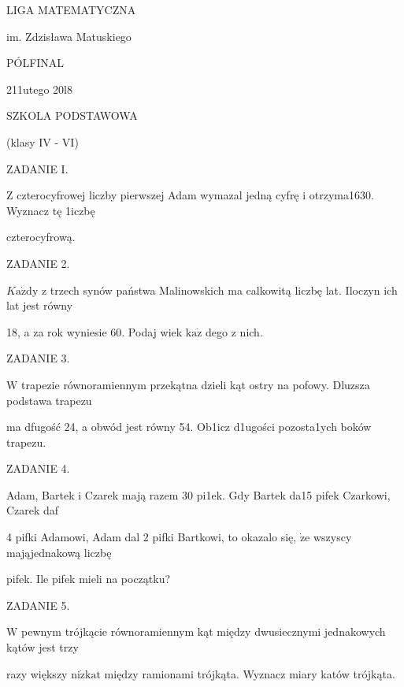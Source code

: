 \documentclass[a4paper,12pt]{article}
\begin{document}
LIGA MATEMATYCZNA

im. Zdzisława Matuskiego

PÓLFINAL

211utego 20l8

SZKOLA PODSTAWOWA

(klasy IV - VI)

ZADANIE I.

$\mathrm{Z}$ czterocyfrowej liczby pierwszej Adam wymazal jedną cyfrę i otrzyma1630. Wyznacz tę 1iczbę

czterocyfrową.

ZADANIE 2.

$K\mathrm{a}\dot{\mathrm{z}}\mathrm{d}\mathrm{y}$ z trzech synów państwa Malinowskich ma calkowitą liczbę lat. Iloczyn ich lat jest równy

18, a za rok wyniesie 60. Podaj wiek $\mathrm{k}\mathrm{a}\dot{\mathrm{z}}$ dego z nich.

ZADANIE 3.

$\mathrm{W}$ trapezie równoramiennym przekątna dzieli kąt ostry na pofowy. Dluzsza podstawa trapezu

ma dfugość 24, a obwód jest równy 54. Ob1icz d1ugości pozosta1ych boków trapezu.

ZADANIE 4.

Adam, Bartek i Czarek mają razem 30 pi1ek. Gdy Bartek da15 pifek Czarkowi, Czarek daf

4 pifki Adamowi, Adam dal 2 pifki Bartkowi, to okazalo się, $\dot{\mathrm{z}}\mathrm{e}$ wszyscy mająjednakową liczbę

pifek. Ile pifek mieli na początku?

ZADANIE 5.

$\mathrm{W}$ pewnym trójkącie równoramiennym kąt między dwusiecznymi jednakowych kątów jest trzy

razy większy $\mathrm{n}\mathrm{i}\dot{\mathrm{z}}\mathrm{k}\mathrm{a}\mathrm{t}$ między ramionami trójkąta. Wyznacz miary katów trójkąta.
\end{document}
